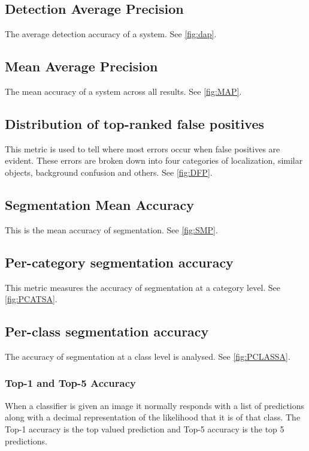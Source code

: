 \subsection{Detection Average Precision}
The average detection accuracy of a system. See \ref{fig:dap}.

\subsection{Mean Average Precision}
The mean accuracy of a system across all results. See \ref{fig:MAP}.
		
\subsection{Distribution of top-ranked false positives}
This metric is used to tell where most errors occur when false positives are
evident. These errors are broken down into four categories of localization,
similar objects, background confusion and others. See \ref{fig:DFP}.

\subsection{Segmentation Mean Accuracy}
This is the mean accuracy of segmentation. See \ref{fig:SMP}.

\subsection{Per-category segmentation accuracy}
This metric measures the accuracy of segmentation at a category level. See \ref{fig:PCATSA}.	

\subsection{Per-class segmentation accuracy}
The accuracy of segmentation at a class level is analysed. See \ref{fig:PCLASSA}.

\subsubsection{Top-1 and Top-5 Accuracy}
When a classifier is given an image it normally responds with a list of
predictions along with a decimal representation of the likelihood that it is of
that class. The Top-1 accuracy is the top valued prediction and Top-5 accuracy
is the top 5 predictions.
		
